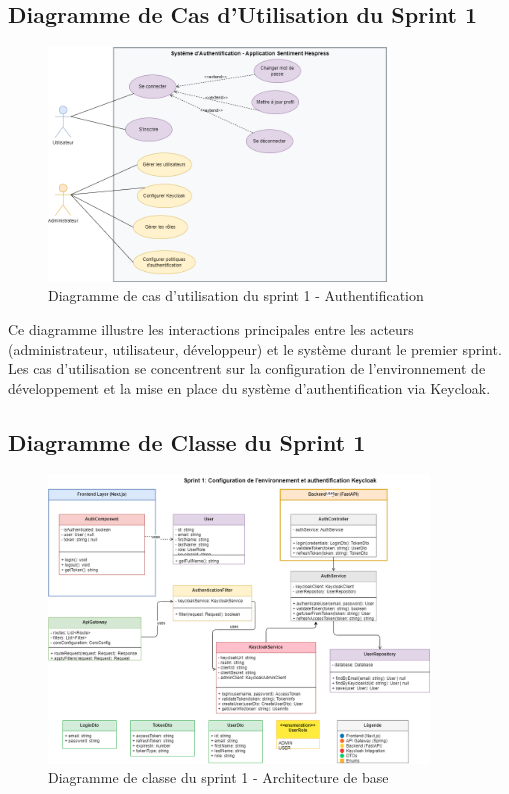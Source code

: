 \subsection{Diagramme de Cas d'Utilisation du Sprint 1}

\begin{figure}[H]
\centering
\includegraphics[width=0.8\textwidth]{assets/images/sprint1-usecase.png} 
\caption{Diagramme de cas d'utilisation du sprint 1 - Authentification}
\label{fig:sprint1-usecase}
\end{figure}

Ce diagramme illustre les interactions principales entre les acteurs (administrateur, utilisateur, développeur) et le système durant le premier sprint. Les cas d'utilisation se concentrent sur la configuration de l'environnement de développement et la mise en place du système d'authentification via Keycloak.

\subsection{Diagramme de Classe du Sprint 1}

\begin{figure}[H]
\centering
\includegraphics[width=0.9\textwidth]{assets/images/sprint1-class.png}
\caption{Diagramme de classe du sprint 1 - Architecture de base}
\label{fig:sprint1-class}
\end{figure}


